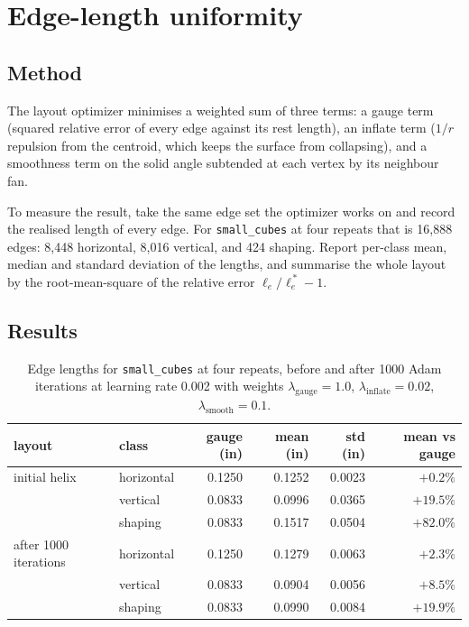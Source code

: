 \documentclass[11pt]{article}
\begin{document}
\section{Edge-length uniformity}

\subsection{Method}

The layout optimizer minimises a weighted sum of three terms: a gauge term
(squared relative error of every edge against its rest length), an inflate term
($1/r$ repulsion from the centroid, which keeps the surface from collapsing),
and a smoothness term on the solid angle subtended at each vertex by its
neighbour fan.

To measure the result, take the same edge set the optimizer works on and record
the realised length of every edge. For \texttt{small\_cubes} at four repeats
that is 16{,}888 edges: 8{,}448 horizontal, 8{,}016 vertical, and
424 shaping. Report per-class mean, median and standard deviation of the
lengths, and summarise the whole layout by the root-mean-square of the relative
error $\ell_e / \ell^{\,*}_e - 1$.

\subsection{Results}

\begin{table}[h]
\centering
\begin{tabular}{llrrrr}
\toprule
layout & class & gauge (in) & mean (in) & std (in) & mean vs gauge \\
\midrule
initial helix
 & horizontal & 0.1250 & 0.1252 & 0.0023 & $+0.2\%$ \\
 & vertical   & 0.0833 & 0.0996 & 0.0365 & $+19.5\%$ \\
 & shaping    & 0.0833 & 0.1517 & 0.0504 & $+82.0\%$ \\
\addlinespace
after 1000 iterations
 & horizontal & 0.1250 & 0.1279 & 0.0063 & $+2.3\%$ \\
 & vertical   & 0.0833 & 0.0904 & 0.0056 & $+8.5\%$ \\
 & shaping    & 0.0833 & 0.0990 & 0.0084 & $+19.9\%$ \\
\bottomrule
\end{tabular}
\caption{Edge lengths for \texttt{small\_cubes} at four repeats, before and
after 1000 Adam iterations at learning rate 0.002 with weights
$\lambda_{\text{gauge}}=1.0$, $\lambda_{\text{inflate}}=0.02$,
$\lambda_{\text{smooth}}=0.1$.}
\label{tab:edges}
\end{table}
\end{document}
